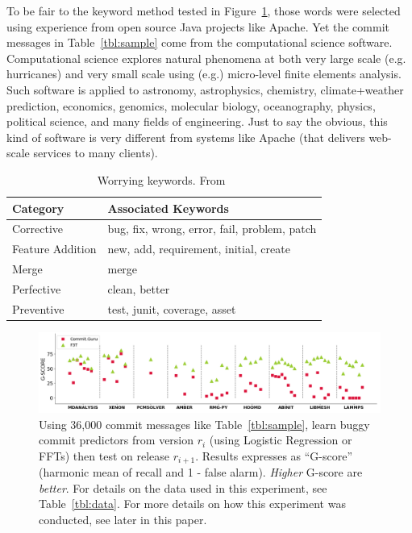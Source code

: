 \documentclass[10pt,journal,compsoc]{IEEEtran}
\newcommand{\fig}[1]{Figure~\ref{fig:#1}}
\newcommand{\tbl}[1]{Table~\ref{tbl:#1}}
\begin{document}
  
  
  To be fair to the keyword method tested in \fig{rq3_1}, those words  were selected  using experience from
 open source Java 
projects like Apache.
Yet  the commit
messages in Table~\ref{tbl:sample} come from
   the computational science software.
Computational science   explores natural phenomena 
at both very large scale (e.g. hurricanes) and very small scale
using (e.g.) micro-level finite elements analysis. Such software is applied to 
astronomy, 
astrophysics, 
chemistry, 
climate+weather prediction, 
economics, 
genomics, 
molecular biology, 
oceanography,
physics, 
political science, 
and many fields of engineering.
Just to say the obvious, this kind of software is very different from
systems like Apache (that 
 delivers web-scale services to many   clients).


   

\begin{table}[!b]
\vspace{-15pt}
\begin{center}
 \caption{  Worrying keywords. From~\cite{hindle08_largecommits}}\label{tab:words}
 \begin{tabular}{l|l}
\rowcolor{gray!30}      \textbf{Category}  &    \textbf{Associated Keywords}    \\\hline
Corrective &  bug, fix, wrong, error, fail, problem, patch \\
Feature Addition & new, add, requirement, initial, create \\
Merge &     merge \\
Perfective & clean, better \\  
Preventive & test, junit, coverage, asset 
\end{tabular}
\end{center}
\end{table}

 \begin{figure}
\caption{Using   36,000 commit messages like         \tbl{sample},
learn  buggy commit predictors from  version $r_i$ (using Logistic Regression or FFTs) then  test  on release $r_{i+1}$. Results expresses
as ``G-score'' (harmonic mean of recall and  1 - false alarm). 
{\em Higher} G-score
are {\em better}.  For details on the data used in this experiment, see \tbl{data}.
 For   more details on how this  experiment was conducted, see later in this paper.
 }\label{fig:rq3_1}
 \vspace{5pt}
\hspace{10mm}\includegraphics[width=.9\linewidth]{rq3_1.png}
\end{figure}   
\end{document}
